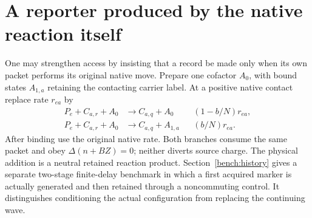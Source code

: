 \documentclass[11pt,oneside,openany]{book}
\theoremstyle{definition}
\theoremstyle{remark}\newtheorem{remark}[theorem]{Remark}
\begin{document}
\section{A reporter produced by the native reaction itself}
One may strengthen access by insisting that a record be made only when
its own packet performs its original native move. Prepare one cofactor
$A_0$, with bound states $A_{1,a}$ retaining the contacting carrier label.
At a positive native contact replace rate $r_{ea}$ by
\begin{align}
 P_e+C_{a,r}+A_0&\longrightarrow C_{a,q}+A_0
 &&(1-b/N)r_{ea},\nonumber\\
 P_e+C_{a,r}+A_0&\longrightarrow C_{a,q}+A_{1,a}
 &&(b/N)r_{ea}.
 \label{acc:nativemark}
\end{align}
After binding use the original native rate. Both branches consume the
same packet and obey $\Delta(n+BZ)=0$; neither diverts source charge.
The physical addition is a neutral retained reaction product.
Section~\ref{bench:history} gives a separate two-stage finite-delay
benchmark in which a first acquired marker is actually generated and
then retained through a noncommuting control. It distinguishes conditioning
the actual configuration from replacing the continuing wave.
\end{document}
